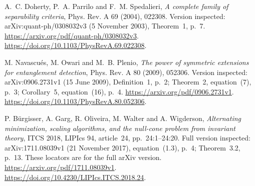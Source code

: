 
A.~C. Doherty, P.~A. Parrilo and F.~M. Spedalieri,
\emph{A complete family of separability criteria},
Phys. Rev. A 69 (2004), 022308.
Version inspected: arXiv:quant-ph/0308032v3 (5 November 2003),
Theorem~1, p.~7.
\url{https://arxiv.org/pdf/quant-ph/0308032v3}.
\url{https://doi.org/10.1103/PhysRevA.69.022308}.

M. Navascu\'es, M. Owari and M.~B. Plenio,
\emph{The power of symmetric extensions for entanglement detection},
Phys. Rev. A 80 (2009), 052306.
Version inspected: arXiv:0906.2731v1 (15 June 2009),
Definition~1, p.~2; Theorem~2, equation~(7), p.~3;
Corollary~5, equation~(16), p.~4.
\url{https://arxiv.org/pdf/0906.2731v1}.
\url{https://doi.org/10.1103/PhysRevA.80.052306}.

P. B\"urgisser, A. Garg, R. Oliveira, M. Walter and A. Wigderson,
\emph{Alternating minimization, scaling algorithms, and the null-cone
problem from invariant theory},
ITCS 2018, LIPIcs 94, article~24, pp.~24:1--24:20.
Full version inspected: arXiv:1711.08039v1 (21 November 2017),
equation~(1.3), p.~4; Theorem~3.2, p.~13.
These locators are for the full arXiv version.
\url{https://arxiv.org/pdf/1711.08039v1}.
\url{https://doi.org/10.4230/LIPIcs.ITCS.2018.24}.
